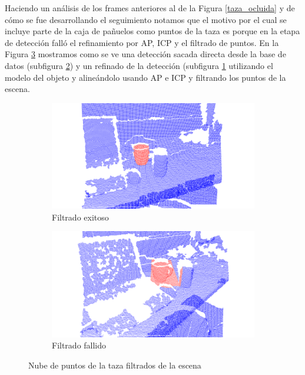 Haciendo un análisis de los frames anteriores al de la Figura \ref{taza_ocluida} y de cómo se fue desarrollando el seguimiento notamos que el motivo por el cual se incluye parte de la caja de pañuelos como puntos de la taza es porque en la etapa de detección falló el refinamiento por AP, ICP y el filtrado de puntos. En la Figura \ref{filtro_en_deteccion} mostramos como se ve una detección sacada directa desde la base de datos (subfigura \ref{filtro_en_deteccion_mal}) y un refinado de la detección (subfigura \ref{filtro_en_deteccion_bien} utilizando el modelo del objeto y alineándolo usando AP e ICP y filtrando los puntos de la escena.

\begin{figure}
	\centering
	\begin{subfigure}[b]{\textwidth}
		\includegraphics[width=\textwidth]{img/taza_filtrado_exitoso_definitivo_depth_frame12.png}
		\caption{Filtrado exitoso}
		\label{filtro_en_deteccion_bien}
	\end{subfigure}
	\quad
	\begin{subfigure}[b]{\textwidth}
		\includegraphics[width=\textwidth]{img/taza_filtrado_fallido_depth_simil_thresh_01_frame66.png}
		\caption{Filtrado fallido}
		\label{filtro_en_deteccion_mal}
	\end{subfigure}		
	\caption{Nube de puntos de la taza filtrados de la escena}
	\label{filtro_en_deteccion}
\end{figure}

